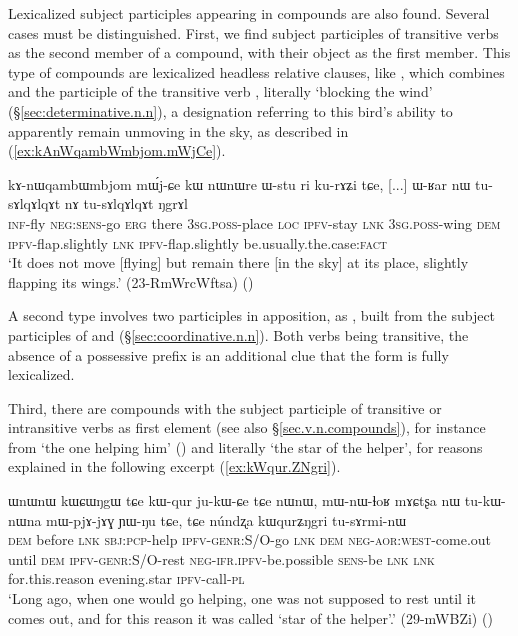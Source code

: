Lexicalized subject participles appearing in compounds are also found. Several cases must be distinguished. First, we find subject participles of transitive verbs as the second member of a compound, with their object as the first member. This type of compounds are lexicalized headless relative clauses, like , which combines   and the participle   of the transitive verb , literally `blocking the wind'   (§\ref{sec:determinative.n.n}), a designation referring to this bird's ability to apparently remain unmoving in the sky, as described in (\ref{ex:kAnWqambWmbjom.mWjCe}).

\begin{exe}
\ex \label{ex:kAnWqambWmbjom.mWjCe}
 \gll  kɤ-nɯqambɯmbjom mɯ́j-ɕe kɯ nɯnɯre ɯ-stu ri ku-rɤʑi tɕe, [...] ɯ-ʁar nɯ tu-sɤlqɤlqɤt nɤ tu-sɤlqɤlqɤt ŋgrɤl  \\
 \textsc{inf}-fly \textsc{neg}:\textsc{sens}-go \textsc{erg} there \textsc{3sg}.\textsc{poss}-place \textsc{loc} \textsc{ipfv}-stay \textsc{lnk} { } \textsc{3sg}.\textsc{poss}-wing \textsc{dem} \textsc{ipfv}-flap.slightly \textsc{lnk}  \textsc{ipfv}-flap.slightly be.usually.the.case:\textsc{fact} \\
 \glt `It does not move [flying] but  remain there [in the sky] at its place, slightly flapping its wings.' (23-RmWrcWftsa)
()
\end{exe}

A second type involves two participles in apposition, as , built from the subject participles of  and   (§\ref{sec:coordinative.n.n}). Both verbs being transitive, the absence of a possessive prefix  is an additional clue that the form is fully lexicalized.

Third, there are compounds with the subject participle of transitive or intransitive verbs as first element (see also §\ref{sec.v.n.compounds}), for instance  from  `the one helping him' () and  literally `the star of the helper', for reasons explained in the following excerpt (\ref{ex:kWqur.ZNgri}).

\begin{exe}
\ex \label{ex:kWqur.ZNgri}
\gll ɯnɯnɯ kɯɕɯŋgɯ tɕe kɯ-qur ju-kɯ-ɕe tɕe nɯnɯ, mɯ-nɯ-ɬoʁ mɤɕtʂa nɯ tu-kɯ-nɯna mɯ-pjɤ-jɤɣ ɲɯ-ŋu tɕe,  tɕe núndʐa kɯqurʑŋgri tu-sɤrmi-nɯ \\
\textsc{dem} before \textsc{lnk} \textsc{sbj}:\textsc{pcp}-help \textsc{ipfv}-\textsc{genr}:S/O-go \textsc{lnk} \textsc{dem} \textsc{neg}-\textsc{aor}:\textsc{west}-come.out until \textsc{dem} \textsc{ipfv}-\textsc{genr}:S/O-rest \textsc{neg}-\textsc{ifr}.\textsc{ipfv}-be.possible \textsc{sens}-be \textsc{lnk} \textsc{lnk} for.this.reason evening.star \textsc{ipfv}-call-\textsc{pl} \\
\glt `Long ago, when one would go helping, one was not supposed to rest until it comes out, and for this reason it was called `star of the helper'.' (29-mWBZi)
()
\end{exe}

